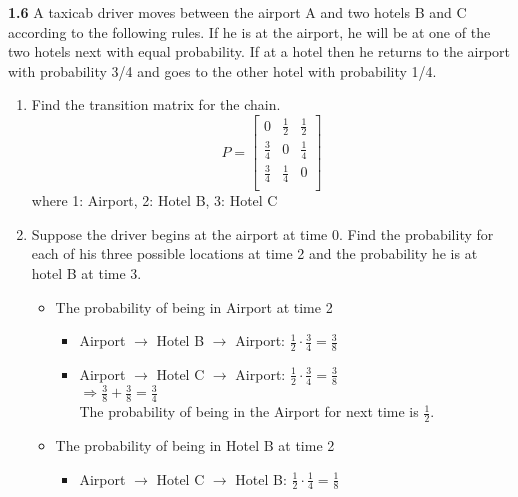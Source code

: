 \documentclass[12pt]{article}
\begin{document}
\newpage\noindent
\textbf{1.6} A taxicab driver moves between the airport A and two hotels B and C
according to the following rules. If he is at the airport, he will be at one of
the two hotels next with equal probability. If at a hotel then he returns to the
airport with probability 3/4 and goes to the other hotel with probability 1/4.
\begin{enumerate}[label=(\alph*)]
    \item Find the transition matrix for the chain.\\
    
    $$P = \begin{bmatrix} 
        0 & \frac{1}{2} & \frac{1}{2} \\ 
        
        \frac{3}{4} & 0 & \frac{1}{4} \\ 
        
        \frac{3}{4} & \frac{1}{4} & 0  \\
        
        \end{bmatrix}$$
    \qquad\qquad\qquad\qquad\qquad\qquad\qquad\qquad\qquad\qquad where 1: Airport, 2: Hotel B, 3: Hotel C\\

    \item Suppose the driver begins
at the airport at time 0. Find the probability for each of his three possible
locations at time 2 and the probability he is at hotel B at time 3.\\
    
    \begin{itemize}
        \item The probability of being in Airport at time 2
            \begin{itemize}
                \item Airport $\rightarrow$ Hotel B $\rightarrow$ Airport: $\frac{1}{2} \cdot \frac{3}{4} = \frac{3}{8}$
                \item Airport $\rightarrow$ Hotel C $\rightarrow$ Airport: $\frac{1}{2} \cdot \frac{3}{4} = \frac{3}{8}$  \\
                $\Rightarrow \frac{3}{8} + \frac{3}{8} = \frac{3}{4}$\\
                
                The probability of being in the Airport for next time is $\frac{1}{2}$.\\
                
            \end{itemize}
        \item The probability of being in Hotel B at time 2
            \begin{itemize}
                \item Airport $\rightarrow$ Hotel C $\rightarrow$ Hotel B: $\frac{1}{2} \cdot \frac{1}{4} = \frac{1}{8}$ \\
                

\end{itemize}
\end{itemize}
\end{enumerate}
\end{document}
